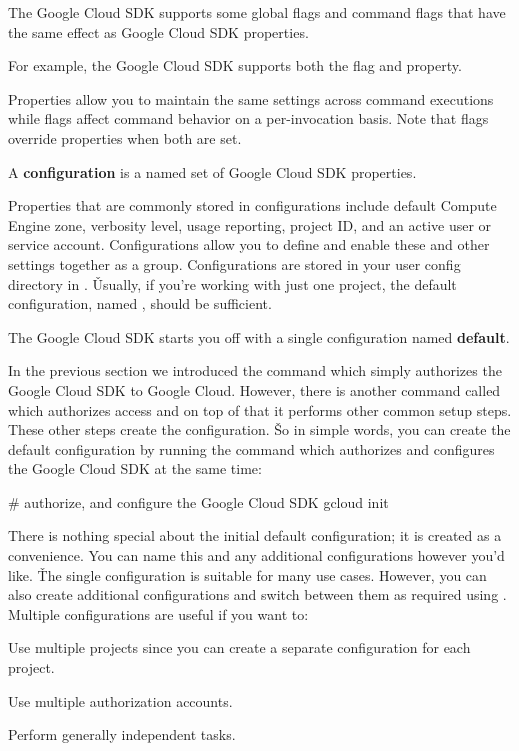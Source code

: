 The Google Cloud SDK supports some global flags and command flags that have the same effect as Google Cloud SDK
properties.

\be
For example, the Google Cloud SDK supports both the  flag and  property.
\ee

Properties allow you to maintain the same settings across command executions while flags affect command behavior on a
per-invocation basis. Note that flags override properties when both are set.

\bd[Configuration]
A \textbf{configuration} is a named set of Google Cloud SDK properties.
\ed

Properties that are commonly stored in configurations include default Compute Engine zone, verbosity level, usage
reporting, project ID, and an active user or service account. Configurations allow you to define and enable these and
other settings together as a group. Configurations are stored in your user config directory in . \v

Usually, if you're working with just one project, the default configuration, named , should be sufficient.

The Google Cloud SDK starts you off with a single configuration named \textbf{default}.
\ed

In the previous section we introduced the command  which simply authorizes the Google Cloud
SDK to Google Cloud. However, there is another command called  which authorizes access and on top
of that it performs other common setup steps. These other steps create the configuration. \v

So in simple words, you can create the default configuration by running the  command which
authorizes and configures the Google Cloud SDK at the same time:
\begin{bash}
# authorize, and configure the Google Cloud SDK
gcloud init
\end{bash}

There is nothing special about the initial default configuration; it is created as a convenience. You can name this
and any additional configurations however you'd like. \v

The single  configuration is suitable for many use cases. However, you can also create additional
configurations and switch between them as required using . Multiple
configurations are useful if you want to:
\bit
\item Use multiple projects since you can create a separate configuration for each project.
\item Use multiple authorization accounts.
\item Perform generally independent tasks.
\eit

